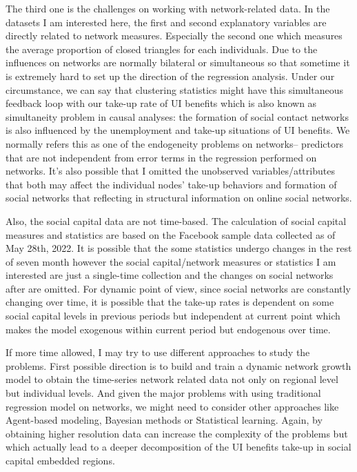 \documentclass{article}
\begin{document}
The third one is the challenges on working with network-related data. In the datasets I am interested here, the first and second explanatory variables are directly related to network measures. Especially the second one which measures the average proportion of closed triangles for each individuals. Due to the influences on networks are normally bilateral or simultaneous so that sometime it is extremely hard to set up the direction of the regression analysis. Under our circumstance, we can say that clustering statistics might have this simultaneous feedback loop with our take-up rate of UI benefits which is also known as simultaneity problem in causal analyses: the formation of social contact networks is also influenced by the unemployment and take-up situations of UI benefits.  We normally refers this as one of the endogeneity problems on networks-- predictors that are not independent from error terms in the regression performed on networks. It's also possible that I omitted the unobserved variables/attributes that both may affect the individual nodes' take-up behaviors and formation of social networks that reflecting in structural information on online social networks.

Also, the social capital data are not time-based. The calculation of social capital measures and statistics are based on the Facebook sample data collected as of May 28th, 2022. It is possible that the some statistics undergo changes in the rest of seven month however the social capital/network measures or statistics I am interested are just a single-time collection and the changes on social networks after are omitted. For dynamic point of view, since social networks are constantly changing over time, it is possible that the take-up rates is dependent on some social capital levels in previous periods but independent at current point which makes the model exogenous within current period but endogenous over time. 


If more time allowed, I may try to use different approaches to study the problems. First possible direction is to build and train a dynamic network growth model to obtain the time-series network related data not only on regional level but individual levels. And given the major problems with using traditional regression model on networks, we might need to consider other approaches like Agent-based modeling, Bayesian methods or Statistical learning. Again, by obtaining higher resolution data can increase the complexity of the problems but which actually lead to a deeper decomposition of the UI benefits take-up in social capital embedded regions.



\newpage

\printbibliography
\end{document}
